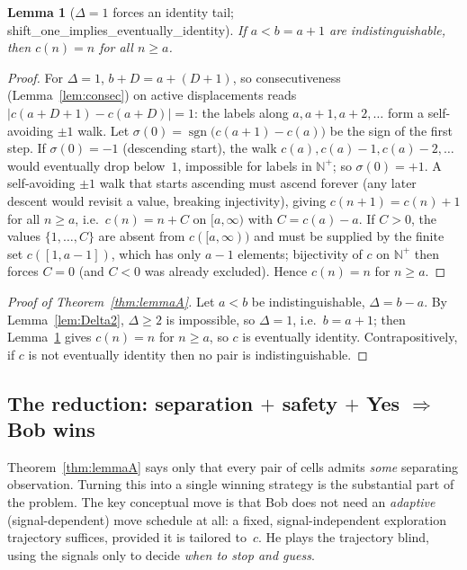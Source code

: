 \documentclass{article}
\newtheorem{lemma}[theorem]{Lemma}
\newcommand{\Np}{\mathbb{N}^{+}}
\DeclareMathOperator{\sgn}{sgn}
\newcommand{\us}{\discretionary{}{}{}\_\discretionary{}{}{}}
\newcommand{\lean}[1]{{\small\ttfamily #1}}
\begin{document}
\begin{lemma}[$\Delta=1$ forces an identity tail;
  \lean{shift\us one\us implies\us eventually\us identity}]\label{lem:Delta1}
If $a<b=a+1$ are indistinguishable, then $c(n)=n$ for all $n\ge a$.
\end{lemma}
\begin{proof}
For $\Delta=1$, $b+D = a+(D+1)$, so consecutiveness
(Lemma~\ref{lem:consec}) on active displacements reads
$|c(a+D+1)-c(a+D)|=1$: the labels along $a, a{+}1, a{+}2, \dots$ form a
self-avoiding $\pm 1$ walk. Let $\sigma(0)=\sgn\bigl(c(a{+}1)-c(a)\bigr)$
be the sign of the first step. If $\sigma(0)=-1$ (descending start), the
walk $c(a), c(a){-}1, c(a){-}2,\dots$ would eventually drop below~$1$,
impossible for labels in $\Np$; so $\sigma(0)=+1$. A self-avoiding $\pm 1$
walk that starts ascending must ascend forever (any later descent would
revisit a value, breaking injectivity), giving $c(n+1)=c(n)+1$ for all
$n\ge a$, i.e.\ $c(n)=n + C$ on $[a,\infty)$ with $C=c(a)-a$. If $C>0$,
the values $\{1,\dots,C\}$ are absent from $c([a,\infty))$ and must be
supplied by the finite set $c([1,a{-}1])$, which has only $a-1$ elements;
bijectivity of $c$ on $\Np$ then forces $C=0$ (and $C<0$ was already
excluded). Hence $c(n)=n$ for $n\ge a$.
\end{proof}

\begin{proof}[Proof of Theorem~\ref{thm:lemmaA}]
Let $a<b$ be indistinguishable, $\Delta=b-a$. By Lemma~\ref{lem:Delta2},
$\Delta\ge 2$ is impossible, so $\Delta=1$, i.e.\ $b=a+1$; then
Lemma~\ref{lem:Delta1} gives $c(n)=n$ for $n\ge a$, so $c$ is eventually
identity. Contrapositively, if $c$ is not eventually identity then no
pair is indistinguishable.
\end{proof}

\subsection{The reduction: separation \texorpdfstring{$+$}{+} safety \texorpdfstring{$+$}{+} Yes \texorpdfstring{$\Rightarrow$}{implies} Bob wins}
\label{sec:reduction}

Theorem~\ref{thm:lemmaA} says only that every pair of cells admits
\emph{some} separating observation. Turning this into a single winning
strategy is the substantial part of the problem. The key conceptual move
is that Bob does not need an \emph{adaptive} (signal-dependent) move
schedule at all: a fixed, signal-independent exploration trajectory
suffices, provided it is tailored to~$c$. He plays the trajectory blind,
using the signals only to decide \emph{when to stop and guess}.
\end{document}
